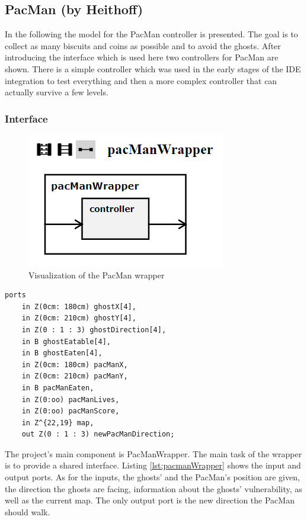 \subsection{PacMan (by Heithoff)}
In the following the model for the PacMan controller is presented. The goal is to collect as many biscuits and coins as possible and to avoid the ghosts. After introducing the interface which is used here two controllers for PacMan are shown. There is a simple controller which was used in the early stages of the IDE integration to test everything and then a more complex controller that can actually survive a few levels.

\subsubsection{Interface}
\begin{figure}
	\label{fig:visPacmanWrapper}
	\centering
	\includegraphics[scale=0.7]{pictures/VisualizationPacManWrapper.png}
	\caption{Visualization of the PacMan wrapper}
\end{figure}
\begin{lstlisting}[label=lst:pacmanWrapper, caption=Interface of the Pacman Wrapper, morekeywords={ports, port, connect, in, out, instance, ->},
frame=single]
ports 
	in Z(0cm: 180cm) ghostX[4],
	in Z(0cm: 210cm) ghostY[4],
	in Z(0 : 1 : 3) ghostDirection[4],
	in B ghostEatable[4],
	in B ghostEaten[4],
	in Z(0cm: 180cm) pacManX,
	in Z(0cm: 210cm) pacManY,
	in B pacManEaten,
	in Z(0:oo) pacManLives,
	in Z(0:oo) pacManScore,
	in Z^{22,19} map,
	out Z(0 : 1 : 3) newPacManDirection;
\end{lstlisting}
The project's main component is PacManWrapper. The main task of the wrapper is to provide a shared interface. Listing \ref{lst:pacmanWrapper} shows the input and output ports. As for the inputs, the ghosts' and the PacMan's position are given, the direction the ghosts are facing, information about the ghosts' vulnerability, as well as the current map. The only output port is the new direction the PacMan should walk. \newline
